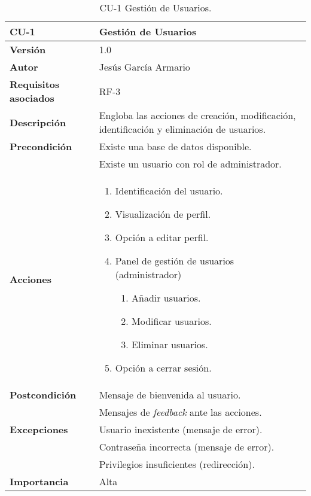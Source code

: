 \begin{table}[p]
	\centering
	\begin{tabularx}{\linewidth}{ p{} p{} }
		\toprule
		\textbf{CU-1}    & \textbf{Gestión de Usuarios}\\
		\toprule
		\textbf{Versión}              & 1.0    \\
		\textbf{Autor}                & Jesús García Armario \\
		\textbf{Requisitos asociados} & RF-3 \\
		\textbf{Descripción}          & Engloba las acciones de creación, modificación, identificación y eliminación de usuarios. \\
		\textbf{Precondición}         & Existe una base de datos disponible. \\
  & Existe un usuario con rol de administrador.\\
		\textbf{Acciones}             &
		\begin{enumerate}
			\def\labelenumi{\arabic{enumi}.}
			\tightlist
			\item Identificación del usuario.
			\item Visualización de perfil.
   \item Opción a editar perfil.
   \item Panel de gestión de usuarios (administrador)
   \begin{enumerate}
       \item Añadir usuarios.
       \item Modificar usuarios.
       \item Eliminar usuarios.
   \end{enumerate}
   \item Opción a cerrar sesión.
		\end{enumerate}\\
		\textbf{Postcondición}        &  Mensaje de bienvenida al usuario. \\
  & Mensajes de \textit{feedback} ante las acciones.\\
		\textbf{Excepciones}          & Usuario inexistente (mensaje de error).\\
  & Contraseña incorrecta (mensaje de error).\\
  & Privilegios insuficientes (redirección).\\
		\textbf{Importancia}          & Alta \\
		\bottomrule
	\end{tabularx}
	\caption{CU-1 Gestión de Usuarios.}
\end{table}


